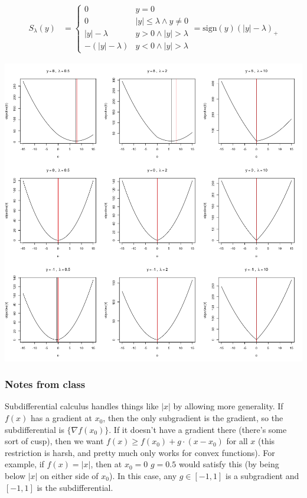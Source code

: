 \documentclass{article}
\begin{document}
\begin{align*}
S_\lambda(y)&=\left\{
\begin{array}{cc}
0 & y = 0\\
0 & |y| \leq \lambda \wedge y\neq 0 \\
|y|-\lambda & y > 0 \wedge |y| > \lambda\\
-(|y|-\lambda) & y < 0 \wedge |y| > \lambda
\end{array}
\right.=\textrm{sign}(y)(|y|-\lambda)_+
\end{align*}

\includegraphics[scale=0.5]{soft_threshold.png}

\subsubsection{Notes from class}
Subdifferential calculus handles things like $|x|$ by allowing more generality. If $f(x)$ has a gradient at $x_0$, then
the only subgradient is the gradient, so the subdifferential is $\{ \nabla f(x_0) \}$. If it doesn't have a gradient there (there's some sort of cusp), then we want $f(x) \geq f(x_0) + g\cdot (x - x_0)$ for all $x$ (this restriction is harsh, and
pretty much only works for convex functions). For example, if $f(x)=|x|$,
then at $x_0=0$ $g=0.5$ would satisfy this (by being below $|x|$ on either side of $x_0$). In this case, any $g\in[-1,1]$
is a subgradient and $[-1,1]$ is the subdifferential.
\end{document}
